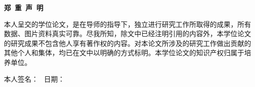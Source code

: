 \vbox{}
\vskip 1cm
\centerline{\songti{}\textbf{郑\ 重\ 声\ 明}}
\vskip 2cm

\songti{}
本人呈交的学位论文，是在导师的指导下，独立进行研究工作所取得的成果，所有数据、图片资料真实可靠。尽我所知，除文中已经注明引用的内容外，本学位论文的研究成果不包含他人享有著作权的内容。对本论文所涉及的研究工作做出贡献的其他个人和集体，均已在文中以明确的方式标明。本学位论文的知识产权归属于培养单位。

\vskip 3cm

本人签名： \qquad \qquad \qquad \qquad \qquad \qquad \qquad\ 日期：

\fancyfoot{}

